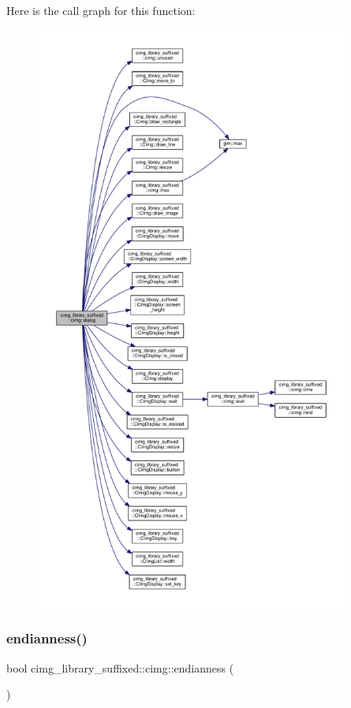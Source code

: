 Here is the call graph for this function\+:
\nopagebreak
\begin{figure}[H]
\begin{center}
\leavevmode
\includegraphics[height=550pt]{d4/d9b/namespacecimg__library__suffixed_1_1cimg_a11aed0e6b30d75bf50946ee78d1aed94_cgraph}
\end{center}
\end{figure}
\mbox{\label{namespacecimg__library__suffixed_1_1cimg_afd898f29e094a625d15928ed19a6b69d}} 
\subsubsection{\texorpdfstring{endianness()}{endianness()}}
{\footnotesize\ttfamily bool cimg\+\_\+library\+\_\+suffixed\+::cimg\+::endianness (\begin{DoxyParamCaption}{ }\end{DoxyParamCaption})\hspace{0.3cm}{\ttfamily [inline]}}




